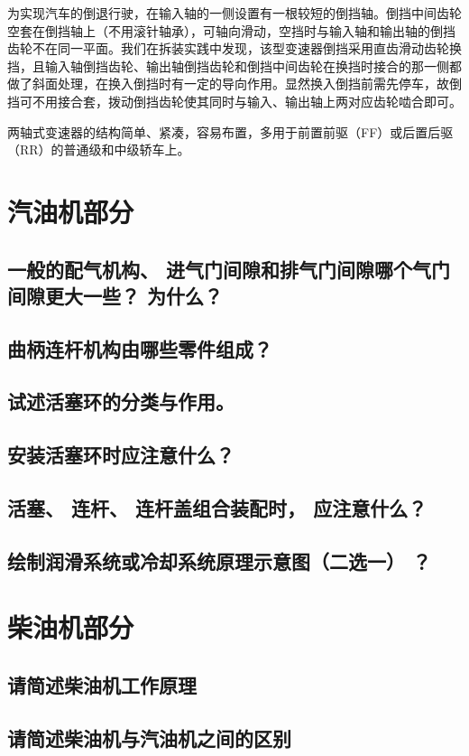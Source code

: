 \documentclass[UTF8]{ctexart}
\numberwithin{figure}{section}
\numberwithin{table}{section}
\begin{document}
为实现汽车的倒退行驶，在输入轴的一侧设置有一根较短的倒挡轴。倒挡中间齿轮空套在倒挡轴上（不用滚针轴承），可轴向滑动，空挡时与输入轴和输出轴的倒挡齿轮不在同一平面。我们在拆装实践中发现，该型变速器倒挡采用直齿滑动齿轮换挡，且输入轴倒挡齿轮、输出轴倒挡齿轮和倒挡中间齿轮在换挡时接合的那一侧都做了斜面处理，在换入倒挡时有一定的导向作用。显然换入倒挡前需先停车，故倒挡可不用接合套，拨动倒挡齿轮使其同时与输入、输出轴上两对应齿轮啮合即可。

两轴式变速器的结构简单、紧凑，容易布置，多用于前置前驱（FF）或后置后驱（RR）的普通级和中级轿车上。

\newpage

\section{汽油机部分}
\subsection{一般的配气机构、 进气门间隙和排气门间隙哪个气门间隙更大一些？ 为什么？}
\subsection{曲柄连杆机构由哪些零件组成？}
\subsection{试述活塞环的分类与作用。}
\subsection{安装活塞环时应注意什么？}
\subsection{活塞、 连杆、 连杆盖组合装配时， 应注意什么？}
\subsection{绘制润滑系统或冷却系统原理示意图（二选一） ？}
\newpage

\section{柴油机部分}
\subsection{请简述柴油机工作原理}
\subsection{请简述柴油机与汽油机之间的区别}
\end{document}
